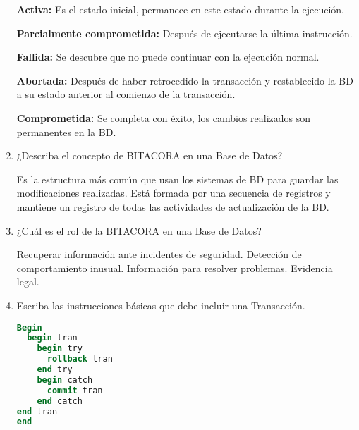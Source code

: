 \begin{enumerate}
\textbf{Activa:} Es el estado inicial, permanece en este estado durante la ejecución. 

\textbf{Parcialmente comprometida:} Después de ejecutarse la última instrucción. 

\textbf{Fallida:} Se descubre que no puede continuar con la ejecución normal. 

\textbf{Abortada:} Después de haber retrocedido la transacción y restablecido la BD a su estado anterior al comienzo de la transacción. 

\textbf{Comprometida:} Se completa con éxito, los cambios realizados son permanentes en la BD.

\item ¿Describa el concepto de BITACORA en una Base de Datos?

Es la estructura más común que usan los sistemas de BD para guardar las modificaciones realizadas. Está formada por una secuencia de registros y mantiene un registro de todas las actividades de actualización de la BD. 

\item ¿Cuál es el rol de la BITACORA en una Base de Datos?

Recuperar información ante incidentes de seguridad. Detección de comportamiento inusual. Información para resolver problemas. Evidencia legal.

\item Escriba las instrucciones básicas que debe incluir una Transacción. 
\begin{lstlisting}[language=SQL]
Begin
  begin tran 
    begin try
      rollback tran
    end try
    begin catch
      commit tran 
    end catch 
end tran 
end 
\end{lstlisting}
\end{enumerate}
